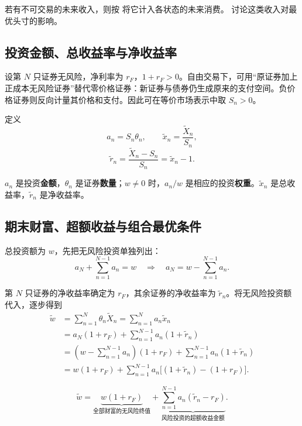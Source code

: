 若有不可交易的未来收入，则按 将它计入各状态的未来消费。 讨论这类收入对最优头寸的影响。

\subsection{投资金额、总收益率与净收益率}
设第 $N$ 只证券无风险，净利率为 $r_F$，$1+r_F>0$。自由交易下，可用“原证券加上正成本无风险证券”替代零价格证券：新证券与债券仍生成原来的支付空间。负价格证券则反向计量其价格和支付。因此可在等价市场表示中取 $S_n>0$。

\begin{tcolorbox}[knowledge,title=数量、金额与收益率]
定义
\begin{equation}
 a_n=S_n\theta_n,\qquad
 \tilde x_n=\frac{\widetilde X_n}{S_n},\label{eq:wj-8-9}
\end{equation}
\begin{equation}
 \tilde r_n=\frac{\widetilde X_n-S_n}{S_n}=\tilde x_n-1.\label{eq:wj-8-10}
\end{equation}

$a_n$ 是投资\textbf{金额}，$\theta_n$ 是证券\textbf{数量}；$w\ne0$ 时，$a_n/w$ 是相应的投资\textbf{权重}。$\tilde x_n$ 是总收益率，$\tilde r_n$ 是净收益率。

\end{tcolorbox}

\subsection{期末财富、超额收益与组合最优条件}
总投资额为 $w$，先把无风险投资单独列出：
\[
 a_N+\sum_{n=1}^{N-1}a_n=w
 \quad\Longrightarrow\quad
 a_N=w-\sum_{n=1}^{N-1}a_n.
\]

第 $N$ 只证券的净收益率确定为 $r_F$，其余证券的净收益率为 $\tilde r_n$。将无风险投资额代入，逐步得到
\[
\begin{aligned}
 \tilde w&=\sum_{n=1}^{N}\theta_n\widetilde X_n
 =\sum_{n=1}^{N}a_n\tilde x_n\\
 &=a_N(1+r_F)+\sum_{n=1}^{N-1}a_n(1+\tilde r_n)\\
 &=\left(w-\sum_{n=1}^{N-1}a_n\right)(1+r_F)
   +\sum_{n=1}^{N-1}a_n(1+\tilde r_n)\\
 &=w(1+r_F)+\sum_{n=1}^{N-1}a_n
   \bigl[(1+\tilde r_n)-(1+r_F)\bigr].
\end{aligned}
\]

\begin{tcolorbox}[knowledge,title=期末财富的分解]
\begin{equation}
 \tilde w=\underbrace{w(1+r_F)}_{\text{全部财富的无风险终值}}
 +\underbrace{\sum_{n=1}^{N-1}a_n(\tilde r_n-r_F)}_{\text{风险投资的超额收益金额}}.
 \label{eq:wj-8-11}
\end{equation}
\end{tcolorbox}


